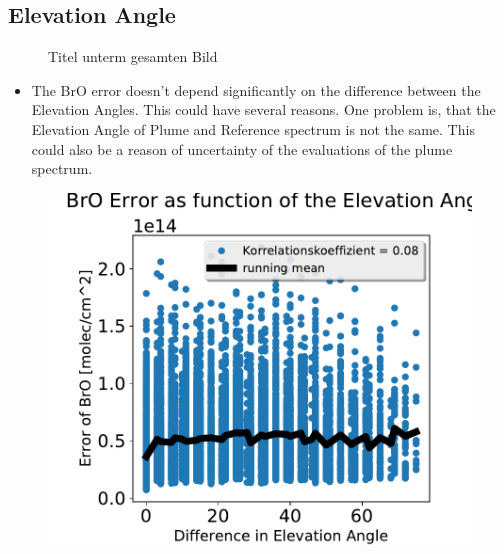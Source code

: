 \documentclass  [
  paper    = a4,
  BCOR     = 10mm,
  twoside,
  fontsize = 12pt,
  fleqn,
  toc      = bibnumbered,
  toc      = listofnumbered,
  numbers  = noendperiod,
  headings = normal,
  listof   = leveldown,
  version  = 3.03
]                                       {scrreprt}
\begin{document}
	\subsection{Elevation Angle}
	\begin{figure}[h!]			
		\caption{Titel unterm gesamten Bild}
	\end{figure}
	\begin{itemize}
		\item 	The BrO error doesn't depend significantly on the difference between the Elevation Angles. This could have several reasons. One problem is, that the Elevation Angle of Plume and Reference spectrum is not the same. This could also be a reason of uncertainty of the evaluations of the plume spectrum.
	\end{itemize}
\begin{figure}
	\centering
	\includegraphics[width=0.7\linewidth]{Bilder/AbsofElevationAngleAsFunctionofBrOError_AllData}
	\caption{}
	\label{fig:absofelevationangleasfunctionofbroerroralldata}
\end{figure}
\end{document}

